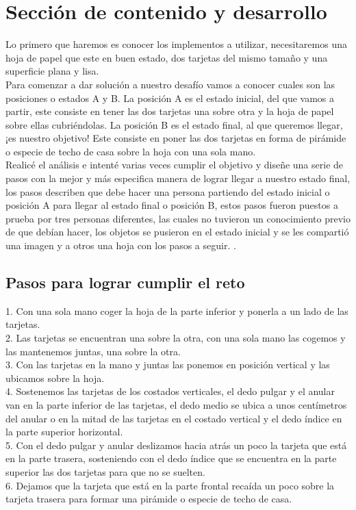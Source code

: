 \documentclass{article}
\begin{document}
\section{Sección de contenido y desarrollo} \label{contenido}
Lo primero que haremos es conocer los implementos a utilizar, necesitaremos una hoja de papel que este en buen estado, dos tarjetas del mismo tamaño y una superficie plana y lisa. \\
Para comenzar a dar solución a nuestro desafío vamos a conocer cuales son las posiciones o estados A y B. La posición A es el estado inicial, del que vamos a partir, este consiste en tener las dos tarjetas una sobre otra y la hoja de papel sobre ellas cubriéndolas. La posición B es el estado final, al que queremos llegar, ¡es nuestro objetivo! Este consiste en poner las dos tarjetas en forma de pirámide o especie de techo de casa sobre la hoja con una sola mano. \\

Realicé el análisis e intenté  varias veces cumplir el objetivo y diseñe una serie de pasos con la mejor y más especifica manera de lograr llegar a nuestro estado final, los pasos describen que debe hacer una persona partiendo del estado inicial o posición A para llegar al estado final o posición B, estos pasos fueron puestos a prueba por tres personas diferentes, las cuales no  tuvieron un conocimiento previo de que debían hacer, los objetos se pusieron en el estado inicial y se  les compartió una imagen y a otros una hoja con los pasos a seguir.
.
\subsection{Pasos para lograr cumplir el reto}

1. Con una sola mano coger la hoja de la parte inferior y ponerla a un lado de las tarjetas.
 \\2.	Las tarjetas se encuentran una sobre la otra, con una sola mano las cogemos y las mantenemos juntas, una sobre la otra.
\\3.	Con las tarjetas en la mano y juntas las ponemos en posición vertical y las ubicamos sobre la hoja. 
\\4.	Sostenemos las tarjetas de los costados verticales, el dedo pulgar y el anular van en la parte inferior de las tarjetas, el dedo medio se ubica a unos centímetros del anular o en la mitad de las tarjetas en el costado vertical y el dedo índice en la parte superior horizontal. \\
5.	Con el dedo pulgar y anular deslizamos hacia atrás un poco la tarjeta que está en la parte trasera, sosteniendo con el dedo índice que se encuentra en la parte superior las dos tarjetas para que no se suelten. \\
6.	Dejamos que la tarjeta que está en la parte frontal recaída un poco sobre la tarjeta trasera para formar una pirámide o especie de techo de casa. 
\end{document}
